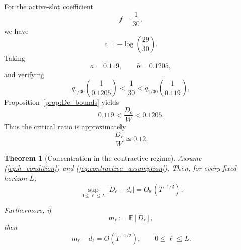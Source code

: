 \documentclass[10pt]{iopart}
\newcommand{\1}{\mathbf{1}}
\newtheorem{theorem}{Theorem}[section]
\begin{document}
For the active-slot coefficient
\begin{equation}
f=\frac{1}{30},
\label{eq:f_numerical}
\end{equation}
we have
\begin{equation}
c=-\log\left(\frac{29}{30}\right).
\label{eq:c_numerical}
\end{equation}
Taking
\begin{equation}
a=0.119,
\qquad
b=0.1205,
\label{eq:ab_numerical}
\end{equation}
and verifying
\begin{equation}
q_{1/30}\left(\frac{1}{0.1205}\right)
<
\frac{1}{30}
<
q_{1/30}\left(\frac{1}{0.119}\right),
\label{eq:Dc_numerical_verification}
\end{equation}
Proposition~\ref{prop:Dc_bounds} yields
\begin{equation}
0.119
<
\frac{D_c}{W}
<
0.1205.
\label{eq:Dc_certified_bounds}
\end{equation}
Thus the critical ratio is approximately
\begin{equation}
\frac{D_c}{W}\simeq 0.12.
\label{eq:Dc_approximation}
\end{equation}

\begin{theorem}[Concentration in the contractive regime]
\label{th:concentration}
Assume (\ref{eq:h_condition}) and (\ref{eq:contractive_assumption}). Then, for every fixed horizon $L$,
\begin{equation}
\sup_{0\le \ell\le L}
|D_\ell-d_\ell|
=
O_{\mathbb P}(T^{-1/2}).
\label{eq:main_concentration}
\end{equation}

Furthermore, if
\begin{equation}
m_\ell:=\mathbb E[D_\ell],
\label{eq:mell_def}
\end{equation}
then
\begin{equation}
m_\ell-d_\ell
=
O(T^{-1/2}),
\qquad
0\le \ell\le L.
\label{eq:mean_estimate}
\end{equation}
\end{theorem}
\end{document}
